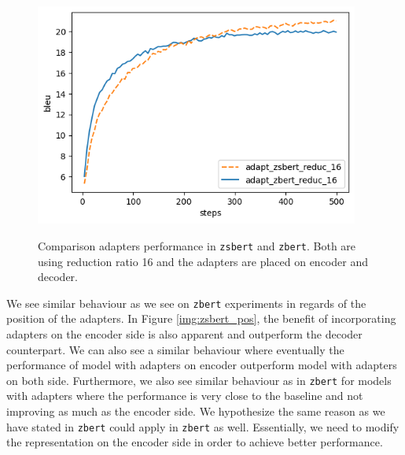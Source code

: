\begin{figure}[h]
    {\includegraphics[width=0.95\textwidth]{img/zbert_vs_zsbert.png}}
    \centering
    \caption{Comparison adapters performance in \texttt{zsbert} and \texttt{zbert}. Both are using reduction ratio 16 and the adapters are placed on encoder and decoder.}
    \label{img:zbert_vs_zsbert}
\end{figure}

We see similar behaviour as we see on \texttt{zbert} experiments in regards of the position of the adapters. In Figure \ref{img:zsbert_pos}, the benefit of incorporating adapters on the encoder side is also apparent and outperform the decoder counterpart. We can also see a similar behaviour where eventually the performance of model with adapters on encoder outperform model with adapters on both side. Furthermore, we also see similar behaviour as in \texttt{zbert} for models with adapters where the performance is very close to the baseline and not improving as much as the encoder side. We hypothesize the same reason as we have stated in \texttt{zbert} could apply in \texttt{zbert} as well. Essentially, we need to modify the representation on the encoder side in order to achieve better performance.